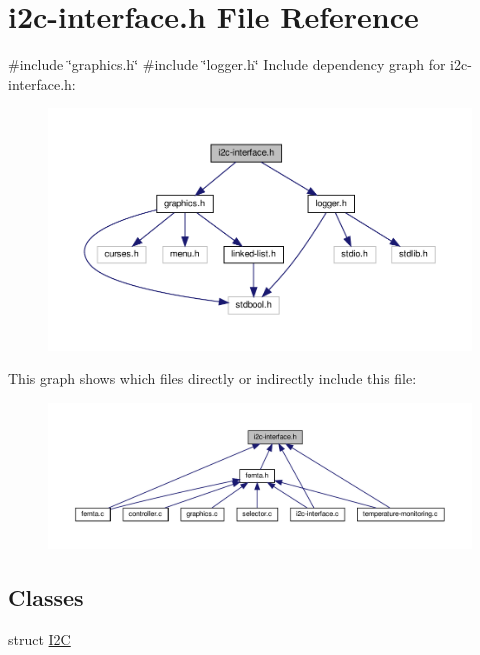 \hypertarget{i2c-interface_8h}{}\section{i2c-\/interface.h File Reference}
\label{i2c-interface_8h}
{\ttfamily \#include \char`\"{}graphics.\+h\char`\"{}}\newline
{\ttfamily \#include \char`\"{}logger.\+h\char`\"{}}\newline
Include dependency graph for i2c-\/interface.h\+:\nopagebreak
\begin{figure}[H]
\begin{center}
\leavevmode
\includegraphics[width=350pt]{i2c-interface_8h__incl}
\end{center}
\end{figure}
This graph shows which files directly or indirectly include this file\+:
\nopagebreak
\begin{figure}[H]
\begin{center}
\leavevmode
\includegraphics[width=350pt]{i2c-interface_8h__dep__incl}
\end{center}
\end{figure}
\subsection*{Classes}
\begin{DoxyCompactItemize}
\item 
struct \hyperlink{structI2C}{I2C}
\end{DoxyCompactItemize}
